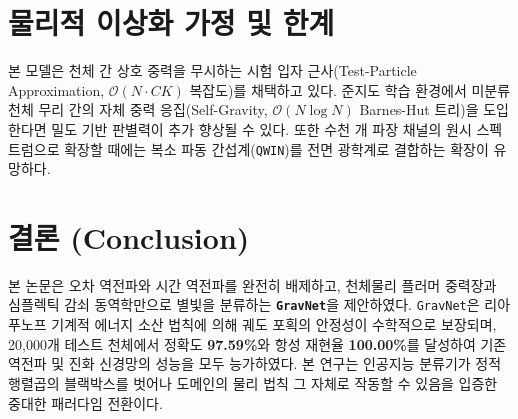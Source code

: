 \documentclass[journal]{IEEEtran}
\begin{document}
\section{물리적 이상화 가정 및 한계}
본 모델은 천체 간 상호 중력을 무시하는 시험 입자 근사(Test-Particle Approximation, $\mathcal{O}(N \cdot CK)$ 복잡도)를 채택하고 있다. 준지도 학습 환경에서 미분류 천체 무리 간의 자체 중력 응집(Self-Gravity, $\mathcal{O}(N \log N)$ Barnes-Hut 트리)을 도입한다면 밀도 기반 판별력이 추가 향상될 수 있다. 또한 수천 개 파장 채널의 원시 스펙트럼으로 확장할 때에는 복소 파동 간섭계(\texttt{QWIN})를 전면 광학계로 결합하는 확장이 유망하다.

\section{결론 (Conclusion)}
본 논문은 오차 역전파와 시간 역전파를 완전히 배제하고, 천체물리 플러머 중력장과 심플렉틱 감쇠 동역학만으로 별빛을 분류하는 \textbf{\texttt{GravNet}}을 제안하였다. \texttt{GravNet}은 리아푸노프 기계적 에너지 소산 법칙에 의해 궤도 포획의 안정성이 수학적으로 보장되며, 20,000개 테스트 천체에서 정확도 \textbf{97.59\%}와 항성 재현율 \textbf{100.00\%}를 달성하여 기존 역전파 및 진화 신경망의 성능을 모두 능가하였다. 본 연구는 인공지능 분류기가 정적 행렬곱의 블랙박스를 벗어나 도메인의 물리 법칙 그 자체로 작동할 수 있음을 입증한 중대한 패러다임 전환이다.
\end{document}
